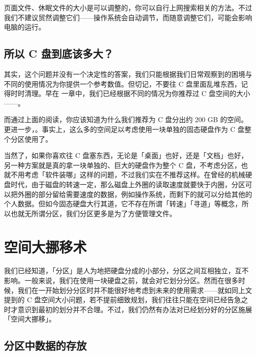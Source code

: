 {页面文件、休眠文件的大小是可以调整的，你可以自行上网搜索相关的方法。不过我们不建议贸然调整它们——操作系统会自动调节，而随意调整它们，可能会影响电脑的运行。

\subsection{所以 C 盘到底该多大？}

其实，这个问题并没有一个决定性的答案，我们只能根据我们日常观察到的困境与不同的使用情况为你提供一个参考数值。但切记，不要往 C 盘里面乱堆东西，记得时时清理。早在 一章中，我们已经根据不同的情况为你推荐过 C 盘空间的大小——。

而通过上面的阅读，你应该知道为什么我们推荐为 C 盘分出约 200 GB 的空间。更进一步，。事实上，这么多的空间足以考虑使用一块单独的固态硬盘作为 C 盘整个分区使用了。

\begin{note}
  当然了，如果你喜欢往 C 盘塞东西，无论是「桌面」也好，还是「文档」也好，另一种方案就是真的拿一块单独的、巨大的硬盘作为整个 C 盘，不考虑分区，也就不用考虑「软件装哪」这样的问题，不过我们实在不推荐这样。在曾经的机械硬盘时代，由于磁盘的转速一定，那么磁盘上外圈的读取速度就要快于内圈，分区可以把外圈的部分留给需要速度的数据，例如操作系统，而剩下的就可以分给其他的个人数据。但如今固态硬盘大行其道，它不存在所谓「转速」「寻道」等概念，所以也就无所谓分区，我们分区更多是为了方便管理文件。
\end{note}

\section{空间大挪移术}

我们已经知道，「分区」是人为地把硬盘分成的小部分，分区之间互相独立，互不影响。一般来说，我们在使用一块硬盘之前，就会对它划分分区。然而在很多时候，我们在一开始划分分区时并不能很好地考虑到未来的使用需求——就如同上文提到的 C 盘空间大小问题，若不提前细致规划，我们往往只能在空间已经告急之时才意识到最初的划分并不合理。不过，我们仍然有办法对已经划分好的分区施展「空间大挪移」。

\subsection{分区中数据的存放}

}
